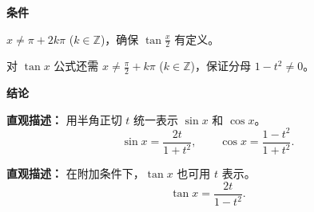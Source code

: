 \begin{statementbox}
	\textbf{\textcolor{CStatement}{条件}}
	\begin{description}[style=nextline, leftmargin=2.8em, labelsep=0.5em, itemsep=0.35em]
		\item[\textbf{\textcolor{CStatement}{条件1（定义限制）：}}]
			$x \neq \pi + 2k\pi$ ($k \in \mathbb{Z}$)，确保 $\tan\frac{x}{2}$ 有定义。
		\item[\textbf{\textcolor{CStatement}{条件2（分母非零）：}}]
			对 $\tan x$ 公式还需 $x \neq \frac{\pi}{2} + k\pi$ ($k \in \mathbb{Z}$)，保证分母 $1-t^2 \neq 0$。
	\end{description}

	\medskip
	\textbf{\textcolor{CStatement}{结论}}
	\begin{description}[style=nextline, leftmargin=2.8em, labelsep=0.5em, itemsep=0.45em]
		\item[\textbf{\textcolor{CStatement}{结论一（正余弦公式）：}}]
			\textbf{\textcolor{CStatement}{直观描述：}}
			用半角正切 $t$ 统一表示 $\sin x$ 和 $\cos x$。
			\[
				\sin x = \frac{2t}{1+t^2},
				\qquad
				\cos x = \frac{1-t^2}{1+t^2}.
			\]
		\item[\textbf{\textcolor{CStatement}{推广结论（正切公式）：}}]
			\textbf{\textcolor{CStatement}{直观描述：}}
			在附加条件下，$\tan x$ 也可用 $t$ 表示。
			\[
				\tan x = \frac{2t}{1-t^2}.
			\]
	\end{description}

\end{statementbox}
